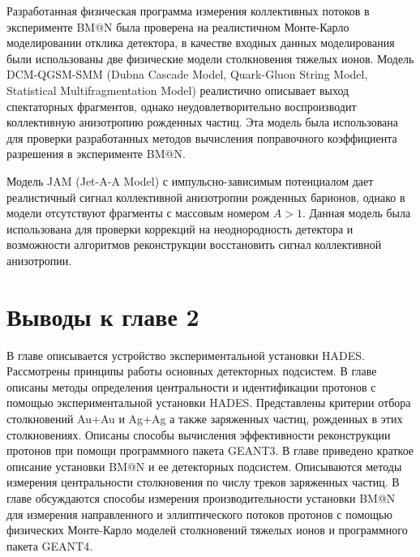 Разработанная физическая программа измерения коллективных потоков в эксперименте BM@N была проверена на реалистичном Монте-Карло моделировании отклика детектора, в качестве входных данных моделирования были использованы две физические модели столкновения тяжелых ионов.
Модель DCM-QGSM-SMM (Dubna Cascade Model, Quark-Gluon String Model, Statistical Multifragmentation Model) реалистично описывает выход спектаторных фрагментов, однако неудовлетворительно воспроизводит коллективную анизотропию рожденных частиц.
Эта модель была использована для проверки разработанных методов вычисления поправочного коэффициента разрешения в эксперименте BM@N.

Модель JAM (Jet-A-A Model) с импульсно-зависимым потенциалом дает реалистичный сигнал коллективной анизотропии рожденных барионов, однако в модели отсутствуют фрагменты с массовым номером $A>1$.
Данная модель была использована для проверки коррекций на неоднородность детектора и возможности алгоритмов реконструкции восстановить сигнал коллективной анизотропии.

\section{Выводы к главе 2}

В главе описывается устройство экспериментальной установки HADES. 
Рассмотрены принципы работы основных детекторных подсистем.
В главе описаны методы определения центральности и идентификации протонов с помощью экспериментальной установки HADES.
Представлены критерии отбора столкновений Au+Au и Ag+Ag а также заряженных частиц, рожденных в этих столкновениях.
Описаны способы вычисления эффективности реконструкции протонов при помощи программного пакета GEANT3.
В главе приведено краткое описание установки BM@N и ее детекторных подсистем.
Описываются методы измерения центральности столкновения по числу треков заряженных частиц. 
В главе обсуждаются способы измерения производительности установки BM@N для измерения направленного и эллиптического потоков протонов с помощью физических Монте-Карло моделей столкновений тяжелых ионов и программного пакета GEANT4.
